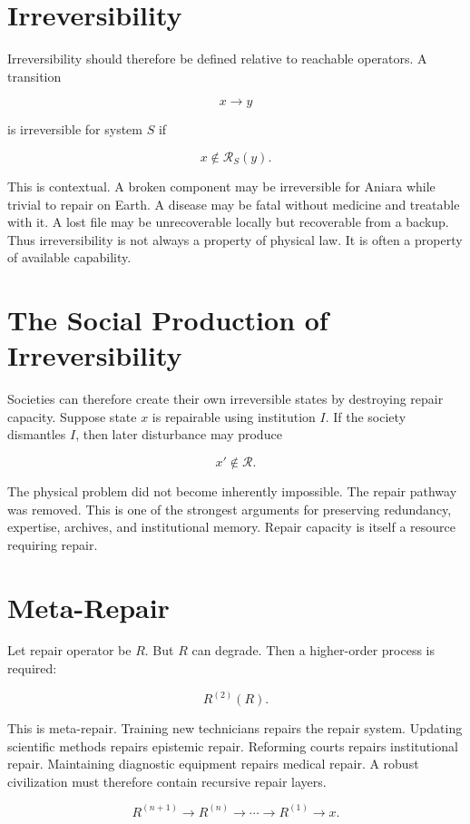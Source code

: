 \documentclass[11pt,oneside]{book}
\theoremstyle{definition}
\theoremstyle{remark}
\newcommand{\R}{\mathcal{R}}
\begin{document}
\section{Irreversibility}

Irreversibility should therefore be defined relative to reachable operators. A transition

\[
x\rightarrow y
\]

is irreversible for system \(S\) if

\[
x\notin\R_S(y).
\]

This is contextual. A broken component may be irreversible for Aniara while trivial to repair on
Earth. A disease may be fatal without medicine and treatable with it. A lost file may be
unrecoverable locally but recoverable from a backup. Thus irreversibility is not always a property
of physical law. It is often a property of available capability.

\section{The Social Production of Irreversibility}

Societies can therefore create their own irreversible states by destroying repair capacity. Suppose
state \(x\) is repairable using institution \(I\). If the society dismantles \(I\), then later
disturbance may produce

\[
x'\notin\R.
\]

The physical problem did not become inherently impossible. The repair pathway was removed. This is
one of the strongest arguments for preserving redundancy, expertise, archives, and institutional
memory. Repair capacity is itself a resource requiring repair.

\section{Meta-Repair}

Let repair operator be \(R\). But \(R\) can degrade. Then a higher-order process is required:

\[
R^{(2)}(R).
\]

This is meta-repair. Training new technicians repairs the repair system. Updating scientific methods
repairs epistemic repair. Reforming courts repairs institutional repair. Maintaining diagnostic
equipment repairs medical repair. A robust civilization must therefore contain recursive repair
layers.

\[
R^{(n+1)} \rightarrow R^{(n)} \rightarrow \cdots \rightarrow R^{(1)} \rightarrow x.
\]
\end{document}
